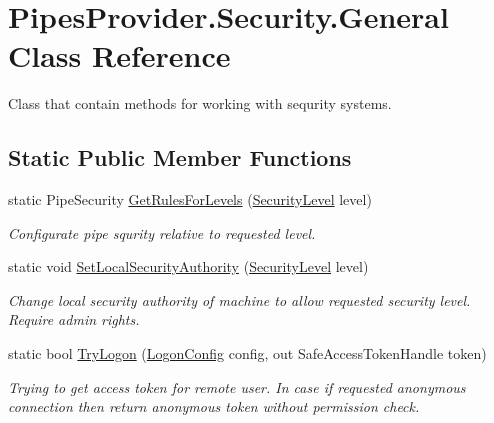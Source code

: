 \hypertarget{class_pipes_provider_1_1_security_1_1_general}{}\section{Pipes\+Provider.\+Security.\+General Class Reference}
\label{class_pipes_provider_1_1_security_1_1_general}


Class that contain methods for working with sequrity systems.  


\subsection*{Static Public Member Functions}
\begin{DoxyCompactItemize}
\item 
static Pipe\+Security \mbox{\hyperlink{class_pipes_provider_1_1_security_1_1_general_a7b89c9d059851b68df31b78c1a2e021c}{Get\+Rules\+For\+Levels}} (\mbox{\hyperlink{namespace_pipes_provider_1_1_security_a1a6020eca1c661a6f7140e8260502d7e}{Security\+Level}} level)
\begin{DoxyCompactList}\small\item\em Configurate pipe squrity relative to requested level. \end{DoxyCompactList}\item 
static void \mbox{\hyperlink{class_pipes_provider_1_1_security_1_1_general_a9536a3073883f12e38979f54c6f389d1}{Set\+Local\+Security\+Authority}} (\mbox{\hyperlink{namespace_pipes_provider_1_1_security_a1a6020eca1c661a6f7140e8260502d7e}{Security\+Level}} level)
\begin{DoxyCompactList}\small\item\em Change local security authority of machine to allow requested security level. Require admin rights. \end{DoxyCompactList}\item 
static bool \mbox{\hyperlink{class_pipes_provider_1_1_security_1_1_general_ab72cbd58c62e331b7602c6f99ad7cf54}{Try\+Logon}} (\mbox{\hyperlink{struct_pipes_provider_1_1_security_1_1_logon_config}{Logon\+Config}} config, out Safe\+Access\+Token\+Handle token)
\begin{DoxyCompactList}\small\item\em Trying to get access token for remote user. In case if requested anonymous connection then return anonymous token without permission check. \end{DoxyCompactList}\end{DoxyCompactItemize}
